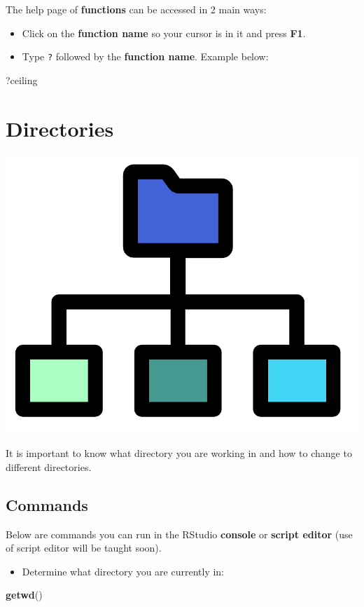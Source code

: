 \documentclass[]{book}
\newenvironment{Shaded}{\begin{snugshade}}{\end{snugshade}}
\newcommand{\KeywordTok}[1]{\textcolor[rgb]{0.13,0.29,0.53}{\textbf{#1}}}
\newcommand{\NormalTok}[1]{#1}
\providecommand{\tightlist}{%
  \setlength{\itemsep}{0pt}\setlength{\parskip}{0pt}}
\begin{document}
The help page of \textbf{functions} can be accessed in 2 main ways:

\begin{itemize}
\tightlist
\item
  Click on the \textbf{function name} so your cursor is in it and press
  \textbf{F1}.
\item
  Type \texttt{?} followed by the \textbf{function name}. Example below:
\end{itemize}

\begin{Shaded}
\begin{Highlighting}[]
\NormalTok{?ceiling}
\end{Highlighting}
\end{Shaded}

\section{Directories}\label{directories}

\begin{center}\includegraphics[width=0.2\linewidth]{figures/directories} \end{center}

It is important to know what directory you are working in and how to
change to different directories.

\subsection{Commands}\label{commands}

Below are commands you can run in the RStudio \textbf{console} or
\textbf{script editor} (use of script editor will be taught soon).

\begin{itemize}
\tightlist
\item
  Determine what directory you are currently in:
\end{itemize}

\begin{Shaded}
\begin{Highlighting}[]
\KeywordTok{getwd}\NormalTok{()}
\end{Highlighting}
\end{Shaded}
\end{document}
